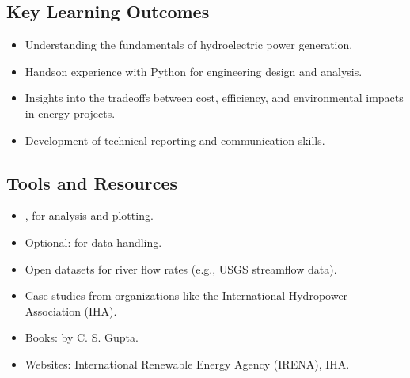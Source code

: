 \documentclass[letterpaper,10pt,english]{jupyterBook}
\begin{document}
\subsection{Key Learning Outcomes}
\label{\detokenize{ProjectInstructions:id17}}\begin{itemize}
\item {} 
\sphinxAtStartPar
Understanding the fundamentals of hydroelectric power generation.

\item {} 
\sphinxAtStartPar
Hands\sphinxhyphen{}on experience with Python for engineering design and analysis.

\item {} 
\sphinxAtStartPar
Insights into the trade\sphinxhyphen{}offs between cost, efficiency, and
environmental impacts in energy projects.

\item {} 
\sphinxAtStartPar
Development of technical reporting and communication skills.

\end{itemize}


\subsection{Tools and Resources}
\label{\detokenize{ProjectInstructions:id18}}
\sphinxAtStartPar
{}
\begin{itemize}
\item {} 
\sphinxAtStartPar
{},  for analysis and plotting.

\item {} 
\sphinxAtStartPar
Optional:  for data handling.

\end{itemize}

\sphinxAtStartPar
{}
\begin{itemize}
\item {} 
\sphinxAtStartPar
Open datasets for river flow rates (e.g., USGS streamflow data).

\item {} 
\sphinxAtStartPar
Case studies from organizations like the International Hydropower
Association (IHA).

\end{itemize}

\sphinxAtStartPar
{}
\begin{itemize}
\item {} 
\sphinxAtStartPar
Books:  by C. S. Gupta.

\item {} 
\sphinxAtStartPar
Websites: International Renewable Energy Agency (IRENA), IHA.

\end{itemize}
\end{document}

